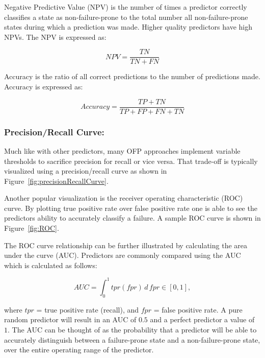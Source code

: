 Negative Predictive Value (NPV) is the number of times a predictor correctly
classifies a state as non-failure-prone to the total number all
non-failure-prone states during which a prediction was made.  Higher quality
predictors have high NPVs.  The NPV is expressed as:

\[ \mathit{NPV}
	= \dfrac{TN}{TN + FN}
\]

Accuracy is the ratio of all correct predictions to the number of predictions
made.  Accuracy is expressed as:

\[ Accuracy 
	= \dfrac{TP + TN}{TP + FP + FN + TN}
\]

\subsubsection{Precision/Recall Curve:}
Much like with other predictors, many OFP approaches implement variable
thresholds to sacrifice precision for recall or vice versa.  That trade-off is
typically visualized using a precision/recall curve as shown in
Figure~\ref{fig:precisionRecallCurve}.

\figprecisionRecallCurve

Another popular visualization is the receiver operating characteristic (ROC)
curve.  By plotting true positive rate over false positive rate one is able to
see the predictors ability to accurately classify a failure.  A sample ROC
curve is shown in Figure~\ref{fig:ROC}.

\figROC

The ROC curve relationship can be further illustrated by calculating the area
under the curve (AUC).  Predictors are commonly compared using the AUC which is
calculated as follows:

$$AUC = \int_{0}^{1} \mathit{tpr}(\mathit{fpr}) \,d\,\mathit{fpr} \in [0,1],$$

\noindent
where $tpr$ = true positive rate (recall), and $fpr$ = false positive rate.  A
pure random predictor will result in an AUC of $0.5$ and a perfect predictor a
value of~$1$.  The AUC can be thought of as the probability that a predictor
will be able to accurately distinguish between a failure-prone state and a
non-failure-prone state, over the entire operating range of the predictor.
